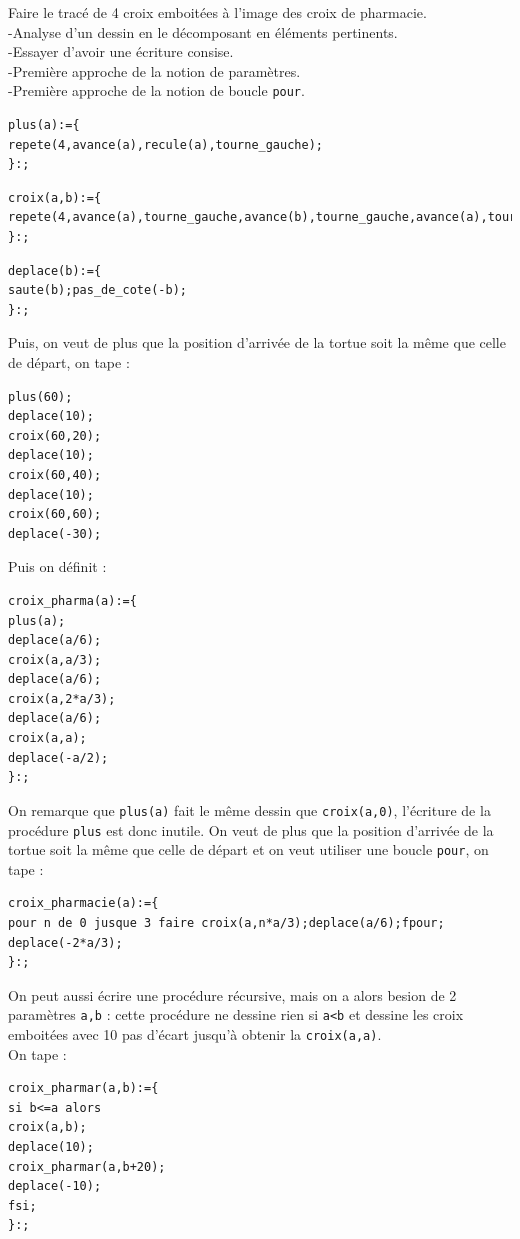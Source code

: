 \documentclass[a4paper,11pt]{book}
\begin{document}
Faire le trac\'e de 4 croix emboit\'ees \`a l'image des croix de pharmacie.\\
-Analyse d'un dessin en le d\'ecomposant en \'el\'ements pertinents.\\
-Essayer d'avoir une \'ecriture consise.\\
-Premi\`ere approche de la notion de param\`etres.\\
-Premi\`ere approche de la notion de boucle {\tt pour}.
\begin{verbatim}
plus(a):={
repete(4,avance(a),recule(a),tourne_gauche);
}:;
\end{verbatim}
\begin{verbatim}
croix(a,b):={
repete(4,avance(a),tourne_gauche,avance(b),tourne_gauche,avance(a),tourne_droite);
}:;
\end{verbatim}
\begin{verbatim}
deplace(b):={
saute(b);pas_de_cote(-b);
}:;
\end{verbatim}
Puis, on veut de plus que la position d'arriv\'ee de la tortue soit la m\^eme 
que celle de d\'epart, on tape :
\begin{verbatim}
plus(60);
deplace(10);
croix(60,20);
deplace(10);
croix(60,40);
deplace(10);
croix(60,60);
deplace(-30);
\end{verbatim}
Puis on d\'efinit :
\begin{verbatim}
croix_pharma(a):={
plus(a);
deplace(a/6);
croix(a,a/3);
deplace(a/6);
croix(a,2*a/3);
deplace(a/6);
croix(a,a);
deplace(-a/2);
}:;
\end{verbatim}
On remarque que {\tt plus(a)} fait le m\^eme dessin que {\tt croix(a,0)}, 
l'\'ecriture de la proc\'edure {\tt plus} est donc inutile.
On veut de plus que la position d'arriv\'ee de la tortue soit la m\^eme que 
celle de d\'epart et on veut utiliser une boucle {\tt pour}, on tape :
\begin{verbatim}
croix_pharmacie(a):={
pour n de 0 jusque 3 faire croix(a,n*a/3);deplace(a/6);fpour;
deplace(-2*a/3);
}:;
\end{verbatim}
On peut aussi \'ecrire une proc\'edure r\'ecursive, mais on a alors besion de 2
 param\`etres {\tt a,b} : cette proc\'edure ne dessine rien si {\tt a<b} 
et dessine les croix emboit\'ees avec 10 pas d'\'ecart jusqu'\`a  obtenir la 
{\tt croix(a,a)}.\\
On tape :
\begin{verbatim}
croix_pharmar(a,b):={
si b<=a alors
croix(a,b);
deplace(10);
croix_pharmar(a,b+20);
deplace(-10);
fsi;
}:;
\end{verbatim}
\end{document}
